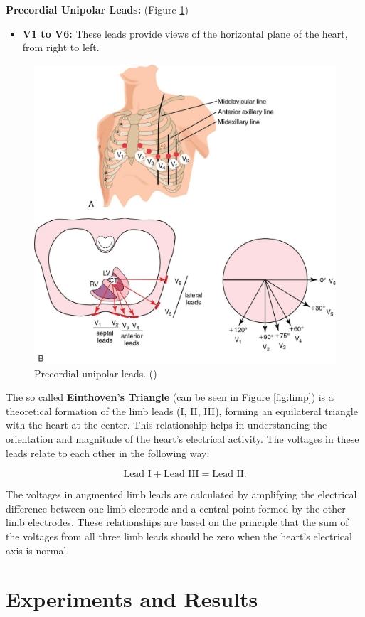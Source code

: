 \documentclass{mldsmsc}
\begin{document}
\noindent \textbf{Precordial Unipolar Leads:} (Figure \ref{fig:vs})
\begin{itemize}
    \item \textbf{V1 to V6:} These leads provide views of the horizontal plane of the heart, from right to left.
\end{itemize}

\begin{figure}[H]
\centering
\includegraphics[width=0.5\linewidth]{images/vs.jpg}
\caption{Precordial unipolar leads. (\cite{huszar})}
\label{fig:vs}
\end{figure}

\noindent The so called  \textbf{Einthoven's Triangle} (can be seen in Figure \ref{fig:limp}) is a theoretical formation of the limb leads (I, II, III), forming an equilateral triangle with the heart at the center. This relationship helps in understanding the orientation and magnitude of the heart's electrical activity. The voltages in these leads relate to each other in the following way:

\begin{equation}
    \text{Lead I} + \text{Lead III} = \text{Lead II}.
\end{equation}

\noindent The voltages in augmented limb leads are calculated by amplifying the electrical difference between one limb electrode and a central point formed by the other limb electrodes. These relationships are based on the principle that the sum of the voltages from all three limb leads should be zero when the heart's electrical axis is normal.

\clearpage

\chapter{Experiments and Results} \label{ch:3}
\end{document}

